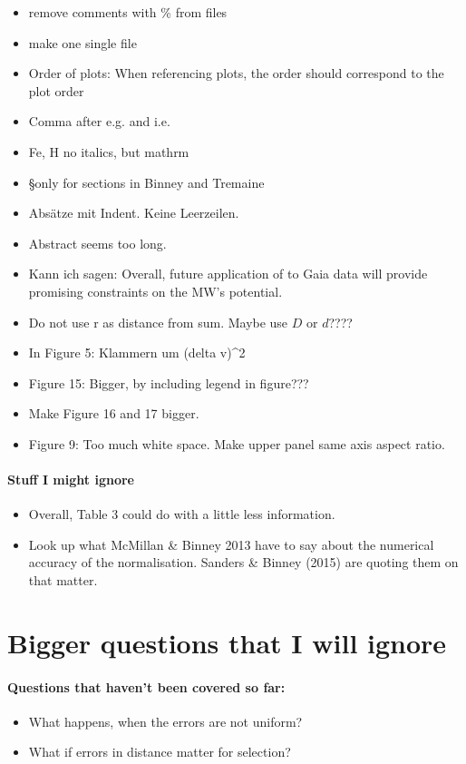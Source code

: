 \begin{itemize}
\item remove comments with \% from files
\item make one single file
\item Order of plots: When referencing plots, the order should correspond to the plot order
\item Comma after e.g. and i.e.
\item Fe, H no italics, but  mathrm
\item \S only for sections in Binney and Tremaine
\item Absätze mit Indent. Keine Leerzeilen.
\item Abstract seems too long.
\item Kann ich sagen: Overall, future application of \RM{} to Gaia data will provide promising constraints on the MW's potential.
\item Do not use r as distance from sum. Maybe use $D$ or $d$????
\item In Figure 5: Klammern um (delta v)^2
\item Figure 15: Bigger, by including legend in figure???
\item Make Figure 16 and 17 bigger.
\item Figure 9: Too much white space. Make upper panel same axis aspect ratio.
\end{itemize}

\paragraph{Stuff I might ignore}
\begin{itemize}
\item Overall, Table 3 could do with a little less information.
\item Look up what McMillan \& Binney 2013 have to say about the numerical accuracy of the normalisation. Sanders \& Binney (2015) are quoting them on that matter.
\end{itemize}



\section{Bigger questions that I will ignore}

\paragraph{Questions that haven't been covered so far:}
\begin{itemize}
\item What happens, when the errors are not uniform?
\item What if errors in distance matter for selection?
\end{itemize}

